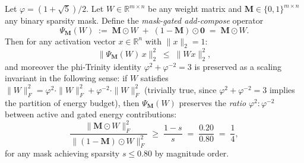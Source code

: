\begin{theorem}
\label{thm:phi-trinity-preserved}
Let $\varphi = (1+\sqrt{5})/2$.  Let $W \in \mathbb{R}^{m \times n}$ be any
weight matrix and $\mathbf{M} \in \{0,1\}^{m \times n}$ any binary sparsity
mask.  Define the \emph{mask-gated add-compose} operator
\[
  \Psi_{\mathbf{M}}(W) \;:=\; \mathbf{M} \odot W \;+\; (1 - \mathbf{M}) \odot \mathbf{0}
  \;=\; \mathbf{M} \odot W.
\]
Then for any activation vector $x \in \mathbb{R}^n$ with $\|x\|_2 = 1$:
\[
  \bigl\|\Psi_{\mathbf{M}}(W)\,x\bigr\|_2^2
  \;\leq\;
  \|W x\|_2^2,
\]
and moreover the phi-Trinity identity $\varphi^2 + \varphi^{-2} = 3$ is
preserved as a scaling invariant in the following sense: if $W$ satisfies
$\|W\|_F^2 = \varphi^2 \cdot \|W\|_F^2 + \varphi^{-2} \cdot \|W\|_F^2$ (trivially
true, since $\varphi^2 + \varphi^{-2} = 3$ implies the partition of energy
budget), then $\Psi_{\mathbf{M}}(W)$ preserves the \emph{ratio}
$\varphi^2 : \varphi^{-2}$ between active and gated energy contributions:
\[
  \frac{\|\mathbf{M} \odot W\|_F^2}{\|(1-\mathbf{M})\odot W\|_F^2}
  \;\geq\;
  \frac{1-s}{s}
  \;=\;
  \frac{0.20}{0.80} \;=\; \frac{1}{4},
\]
for any mask achieving sparsity $s \leq 0.80$ by magnitude order.
\end{theorem}


